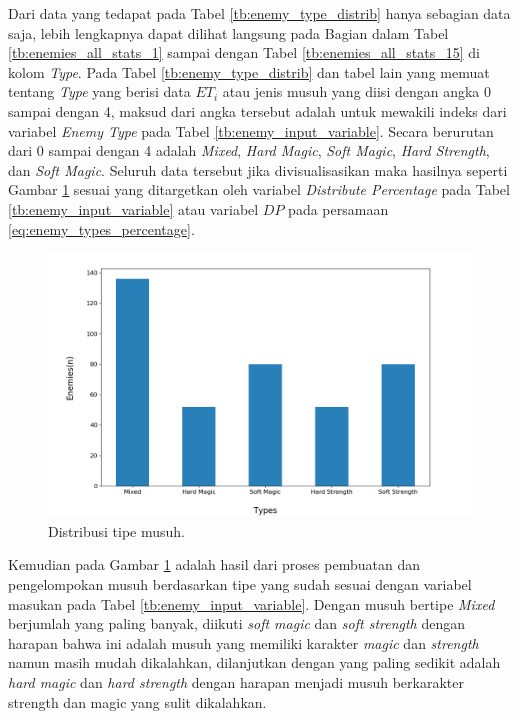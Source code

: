 Dari data yang tedapat pada Tabel \ref{tb:enemy_type_distrib} hanya sebagian data saja, lebih lengkapnya dapat dilihat langsung pada Bagian  dalam Tabel \ref{tb:enemies_all_stats_1} sampai dengan Tabel \ref{tb:enemies_all_stats_15} di kolom \textit{Type}. Pada Tabel \ref{tb:enemy_type_distrib} dan tabel lain yang memuat tentang \textit{Type} yang berisi data $ET_{i}$ atau jenis musuh yang diisi dengan angka 0 sampai dengan 4, maksud dari angka tersebut adalah untuk mewakili indeks dari variabel \textit{Enemy Type} pada Tabel \ref{tb:enemy_input_variable}. Secara berurutan dari 0 sampai dengan 4 adalah \textit{Mixed}, \textit{Hard Magic}, \textit{Soft Magic}, \textit{Hard Strength}, dan \textit{Soft Magic}. Seluruh data tersebut jika divisualisasikan maka hasilnya seperti Gambar \ref{fig:enemy_type_distrib} sesuai yang ditargetkan oleh variabel \textit{Distribute Percentage} pada Tabel \ref{tb:enemy_input_variable} atau variabel $DP$ pada persamaan \ref{eq:enemy_types_percentage}.

\begin{figure} [!h] \centering
	\includegraphics[scale=0.48]{img/EnemyTypeDistrib.png}
	\caption{Distribusi tipe musuh.}
	\label{fig:enemy_type_distrib}
\end{figure}

Kemudian pada Gambar \ref{fig:enemy_type_distrib} adalah hasil dari proses pembuatan dan pengelompokan musuh berdasarkan tipe yang sudah sesuai dengan variabel masukan pada Tabel \ref{tb:enemy_input_variable}. Dengan musuh bertipe \textit{Mixed} berjumlah yang paling banyak, diikuti \textit{soft magic} dan \textit{soft strength} dengan harapan bahwa ini adalah musuh yang memiliki karakter \textit{magic} dan \textit{strength} namun masih mudah dikalahkan, dilanjutkan dengan yang paling sedikit adalah \textit{hard magic} dan \textit{hard strength} dengan harapan menjadi musuh berkarakter strength dan magic yang sulit dikalahkan.
\vspace{1ex}


